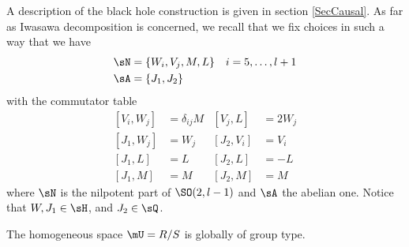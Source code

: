 A description of the black hole construction is given in section \ref{SecCausal}. As far as Iwasawa decomposition is concerned, we recall that we fix choices in such a way that we have
\begin{subequations}
\begin{align}
\sN&=\{W_i,V_j,M,L\}&i=5,\ldots, l+1\\
\sA&=\{J_1,J_2\}
\end{align}
\end{subequations}
 with the commutator table
\begin{subequations} %
\begin{align}
[V_i,W_j]&=\delta_{ij}M &[V_j,L]&=2W_j\\
[J_1,W_j]&=W_j       &[J_2,V_i]&=V_i\\
[J_1,L]&=L           &[J_2,L]&=-L\\
[J_1,M]&=M           &[J_2,M]&=M
\end{align}
\end{subequations}
  where $\sN$ is the nilpotent part of $\SO(2,l-1)$ and $\sA$ the abelian one. Notice that $W,J_{1}\in\sH$, and $J_{2}\in\sQ$.

\begin{proposition}\label{PropRsurSglobgroup}
The homogeneous space $\mU=R/S$ is globally of group type.
\end{proposition}


